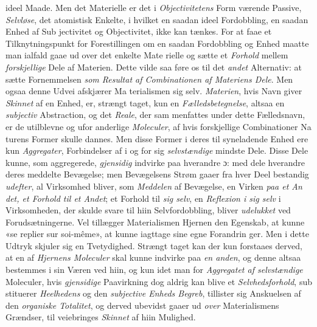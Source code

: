 ideel Maade. Men det Materielle er det i \emph{Objectivitetens}
Form værende Passive, \emph{Selvløse}, det atomistisk Enkelte, i
hvilket en saadan ideel Fordobbling, en saadan Enhed af Sub\-%
jectivitet og Objectivitet, ikke kan tænkes. For at faae et
Tilknytningspunkt for Forestillingen om en saadan Fordobbling
og Enhed maatte man ialfald gaae ud over det enkelte Mate\-%
rielle og sætte et \emph{Forhold} mellem \emph{forskjellige} Dele af
Materien. Dette vilde saa føre os til det \emph{andet} Alternativ:
at sætte Fornemmelsen \emph{som Resultat af Combinationen
af Materiens Dele}. Men ogsaa denne Udvei afskjærer Ma\-%
terialismen sig selv. \emph{Materien}, hvis Navn giver \emph{Skinnet}
af en Enhed, er, strængt taget, kun en \emph{Fælledsbetegnelse},
altsaa en \emph{subjectiv} Abstraction, og det \emph{Reale}, der sam\-%
menfattes under dette Fælledsnavn, er de utilblevne og ufor\-%
anderlige \emph{Moleculer}, af hvis forskjellige Combinationer Na\-%
turens Former skulle dannes. Men disse Former i deres til\-%
syneladende Enhed ere kun \emph{Aggregater}, Forbindelser af i
og for sig \emph{selvstændige} mindste Dele. Disse Dele kunne,
som aggregerede, \emph{gjensidig} indvirke paa hverandre ɔ: med\-%
dele hverandre deres meddelte Bevægelse; men Bevægelsens
Strøm gaaer fra hver Deel bestandig \emph{udefter}, al Virksomhed
bliver, som \emph{Meddelen} af Bevægelse, en Virken \emph{paa et An\-%
det, et Forhold til et Andet}; et Forhold til \emph{sig selv}, en
\emph{Reflexion i sig selv} i Virksomheden, der skulde svare til hiin
Selvfordobbling, bliver \emph{udelukket} ved Forudsætningerne. Vel
tillægger Materialismen Hjernen den Egenskab, at kunne «se
replier sur soi-même», at kunne iagttage sine egne Forandrin\-%
ger. Men i dette Udtryk skjuler sig en Tvetydighed. Strængt
taget kan der kun forstaaes derved, at en af \emph{Hjernens
Moleculer} skal kunne indvirke paa \emph{en anden}, og denne
altsaa bestemmes i sin Væren ved hiin, og kun idet man for
\emph{Aggregatet af selvstændige} Moleculer, hvis \emph{gjensidige}
Paavirkning dog aldrig kan blive et \emph{Selvhedsforhold}, sub\-%
stituerer \emph{Heelhedens} og den \emph{subjective Enheds Begreb},
tillister sig Anskuelsen af den \emph{organiske Totalitet}, og
derved ubevidst gaaer ud \emph{over} Materialismens Grændser, til\-%
veiebringes \emph{Skinnet} af hiin Mulighed.

